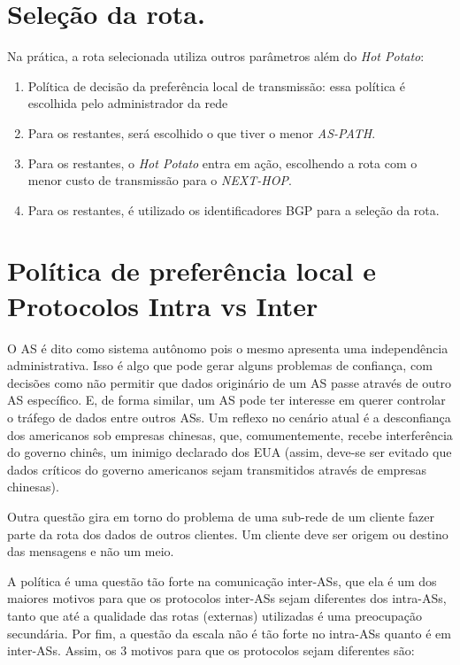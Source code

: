 \hypertarget{Seleção da rota.}{%
\section{Seleção da rota.}\label{Seleção da rota.}}

Na prática, a rota selecionada utiliza outros parâmetros além do
\emph{Hot Potato}:

\begin{enumerate}
\def\labelenumi{\arabic{enumi}.}
\tightlist
\item
  Política de decisão da preferência local de transmissão: essa política
  é escolhida pelo administrador da rede
\item
  Para os restantes, será escolhido o que tiver o menor \emph{AS-PATH}.
\item
  Para os restantes, o \emph{Hot Potato} entra em ação, escolhendo a
  rota com o menor custo de transmissão para o \emph{NEXT-HOP}.
\item
  Para os restantes, é utilizado os identificadores BGP para a seleção
  da rota.
\end{enumerate}

\hypertarget{poluxedtica-de-preferuxeancia-local-e-protocolos-intra-vs-inter}{%
\section{Política de preferência local e Protocolos Intra vs Inter}\label{poluxedtica-de-preferuxeancia-local-e-protocolos-intra-vs-inter}}

O AS é dito como sistema autônomo pois o mesmo apresenta uma
independência administrativa. Isso é algo que pode gerar alguns
problemas de confiança, com decisões como não permitir que dados
originário de um AS passe através de outro AS específico. E, de forma
similar, um AS pode ter interesse em querer controlar o tráfego de dados
entre outros ASs. Um reflexo no cenário atual é a desconfiança dos
americanos sob empresas chinesas, que, comumentemente, recebe
interferência do governo chinês, um inimigo declarado dos EUA (assim,
deve-se ser evitado que dados críticos do governo americanos sejam
transmitidos através de empresas chinesas).

Outra questão gira em torno do problema de uma sub-rede de um cliente
fazer parte da rota dos dados de outros clientes. Um cliente deve ser
origem ou destino das mensagens e não um meio.

A política é uma questão tão forte na comunicação inter-ASs, que ela é
um dos maiores motivos para que os protocolos inter-ASs sejam diferentes
dos intra-ASs, tanto que até a qualidade das rotas (externas) utilizadas
é uma preocupação secundária. Por fim, a questão da escala não é tão
forte no intra-ASs quanto é em inter-ASs. Assim, os 3 motivos para que
os protocolos sejam diferentes são:

